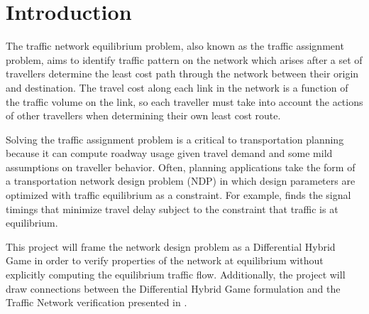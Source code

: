 \section{Introduction}

The traffic network equilibrium problem, also known as the traffic assignment problem, aims to identify traffic pattern on the network which arises after a set of travellers determine the least cost path through the network between their origin and destination.\citep{nagurney2009netecon}
The travel cost along each link in the network is a function of the traffic volume on the link, so each traveller must take into account the actions of other travellers when determining their own least cost route.

Solving the traffic assignment problem is a critical to transportation planning because it can compute roadway usage given travel demand and some mild assumptions on traveller behavior.
Often, planning applications take the form of a transportation network design problem (NDP) in which design parameters are optimized with traffic equilibrium as a constraint.
For example, \citet{sheffi1983optimal} finds the signal timings that minimize travel delay subject to the constraint that traffic is at equilibrium.

This project will frame the network design problem as a Differential Hybrid Game \citep{DBLP:journals/tocl/Platzer17} in order to verify properties of the network at equilibrium without explicitly computing the equilibrium traffic flow.
Additionally, the project will draw connections between the Differential Hybrid Game formulation and the Traffic Network verification presented in \citet{DBLP:conf/itsc/MullerMP15}.

